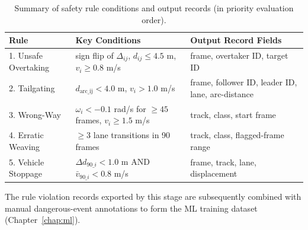 \begin{table}[H]
\centering
\small
\caption{Summary of safety rule conditions and output records (in priority evaluation order).}
\label{tab:rule_params}
\begin{tabularx}{\textwidth}{l X X}
\toprule
\textbf{Rule} & \textbf{Key Conditions} & \textbf{Output Record Fields} \\
\midrule
1. Unsafe Overtaking & sign flip of $\Delta_{ij}$, $d_{ij} \le 4.5$ m, $v_i \ge 0.8$ m/s & frame, overtaker ID, target ID \\
2. Tailgating      & $d_{\text{arc\_ij}} < 4.0$ m, $v_i > 1.0$ m/s & frame, follower ID, leader ID, lane, arc-distance \\
3. Wrong-Way       & $\omega_i < -0.1$ rad/s for $\ge 45$ frames, $v_i \ge 1.5$ m/s & track, class, start frame \\
4. Erratic Weaving & $\ge 3$ lane transitions in 90 frames & track, class, flagged-frame range \\
5. Vehicle Stoppage & $\Delta d_{90\_i} < 1.0$ m AND $\bar{v}_{90\_i} < 0.8$ m/s & frame, track, lane, displacement \\
\bottomrule
\end{tabularx}
\end{table}

The rule violation records exported by this stage are subsequently combined with manual dangerous-event annotations to form the ML training dataset (Chapter~\ref{chap:ml}).